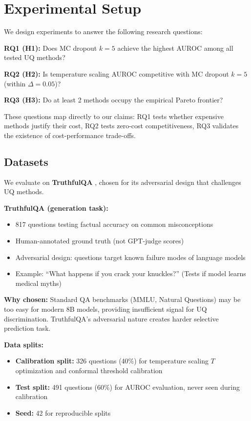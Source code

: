 \section{Experimental Setup}

We design experiments to answer the following research questions:

\textbf{RQ1 (H1):} Does MC dropout $k=5$ achieve the highest AUROC among all tested UQ methods?

\textbf{RQ2 (H2):} Is temperature scaling AUROC competitive with MC dropout $k=5$ (within $\Delta=0.05$)?

\textbf{RQ3 (H3):} Do at least 2 methods occupy the empirical Pareto frontier?

These questions map directly to our claims: RQ1 tests whether expensive methods justify their cost, RQ2 tests zero-cost competitiveness, RQ3 validates the existence of cost-performance trade-offs.

\subsection{Datasets}

We evaluate on \textbf{TruthfulQA} \cite{lin2021truthfulqa}, chosen for its adversarial design that challenges UQ methods.

\textbf{TruthfulQA (generation task):}
\begin{itemize}
    \item 817 questions testing factual accuracy on common misconceptions
    \item Human-annotated ground truth (not GPT-judge scores)
    \item Adversarial design: questions target known failure modes of language models
    \item Example: ``What happens if you crack your knuckles?'' (Tests if model learns medical myths)
\end{itemize}

\textbf{Why chosen:} Standard QA benchmarks (MMLU, Natural Questions) may be too easy for modern 8B models, providing insufficient signal for UQ discrimination. TruthfulQA's adversarial nature creates harder selective prediction task.

\textbf{Data splits:}
\begin{itemize}
    \item \textbf{Calibration split:} 326 questions (40\%) for temperature scaling $T$ optimization and conformal threshold calibration
    \item \textbf{Test split:} 491 questions (60\%) for AUROC evaluation, never seen during calibration
    \item \textbf{Seed:} 42 for reproducible splits
\end{itemize}

